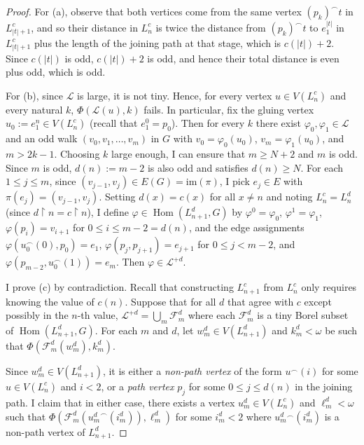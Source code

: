 \documentclass[11pt]{article}
\theoremstyle{plain}
\theoremstyle{definition}
\theoremstyle{remark}
\DeclareMathOperator{\Hom}{Hom}
\begin{document}
\begin{proof}
    For (a), observe that both vertices come from the same vertex $(p_k)^\smallfrown t$ in $L^c_{|t|+1}$, and so their distance in $L^c_n$ is twice the distance from $(p_k)^\smallfrown t$ to $e_1^{|t|}$ in $L^c_{|t|+1}$ plus the length of the joining path at that stage, which is $c(|t|)+2$.
    Since $c(|t|)$ is odd, $c(|t|)+2$ is odd, and hence their total distance is even plus odd, which is odd.

    For (b), since $\mathcal L$ is large, it is not tiny.
    Hence, for every vertex $u\in V(L^c_n)$ and every natural $k$, $\Phi(\mathcal L(u),k)$ fails.
    In particular, fix the gluing vertex $u_0:=e_1^n\in V(L^c_n)$ (recall that $e_1^0=p_0$).
    Then for every $k$ there exist $\varphi_0,\varphi_1\in\mathcal L$ and an odd walk $(v_0,v_1,\dots,v_m)$ in $G$ with $v_0=\varphi_0(u_0)$, $v_m=\varphi_1(u_0)$, and $m>2k-1$.
    Choosing $k$ large enough, I can ensure that $m\geq N+2$ and $m$ is odd.
    Since $m$ is odd, $d(n):=m-2$ is also odd and satisfies $d(n)\geq N$.
    For each $1\leq j\leq m$, since $(v_{j-1},v_j)\in E(G)=\mathrm{im}(\pi)$, I pick $e_j\in E$ with $\pi(e_j)=(v_{j-1},v_j)$.
    Setting $d(x)=c(x)$ for all $x\neq n$ and noting $L^c_n=L^d_n$ (since $d\restriction n=c\restriction n$), I define $\varphi\in\Hom(L_{n+1}^d,G)$ by $\varphi^0=\varphi_0$, $\varphi^1=\varphi_1$, $\varphi(p_i)=v_{i+1}$ for $0\leq i\leq m-2=d(n)$, and the edge assignments $\varphi(u_0^\frown (0),p_0)=e_1$, $\varphi(p_j,p_{j+1})=e_{j+1}$ for $0\leq j<m-2$, and $\varphi(p_{m-2},u_0^\frown (1))=e_m$.
    Then $\varphi\in\mathcal L^{+d}$.

    I prove (c) by contradiction.
    Recall that constructing $L^c_{n+1}$ from $L^c_n$ only requires knowing the value of $c(n)$.
    Suppose that for all $d$ that agree with $c$ except possibly in the $n$-th value, $\mathcal L^{+d}=\bigcup_m\mathcal F^d_m$ where each $\mathcal F^d_m$ is a tiny Borel subset of $\Hom(L^d_{n+1},G)$.
    For each $m$ and $d$, let $w^d_m\in V(L^d_{n+1})$ and $k^d_m<\omega$ be such that $\Phi(\mathcal F^d_m(w^d_m),k^d_m)$.
    
    Since $w^d_m\in V(L^d_{n+1})$, it is either a \emph{non-path vertex} of the form $u^\smallfrown(i)$ for some $u\in V(L^c_n)$ and $i<2$, or a \emph{path vertex} $p_j$ for some $0\leq j\leq d(n)$ in the joining path.
    I claim that in either case, there exists a vertex $u^d_m\in V(L^c_n)$ and $\ell^d_m<\omega$ such that $\Phi(\mathcal F^d_m({u^d_m}^\smallfrown(i^d_m)),\ell^d_m)$ for some $i^d_m<2$ where $u^d_m{}^\smallfrown(i^d_m)$ is a non-path vertex of $L^d_{n+1}$.


\end{proof}
\end{document}

